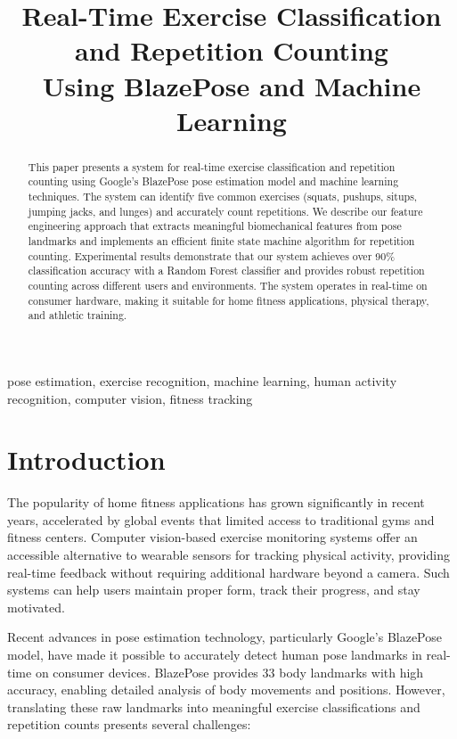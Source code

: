 \documentclass[conference]{IEEEtran}
\title{Real-Time Exercise Classification and Repetition Counting \\Using BlazePose and Machine Learning}
\author{\IEEEauthorblockN{Atharv Khisti}
\IEEEauthorblockA{Department of Computer Science\\
University Name\\
City, Country\\
email@example.com}}
\begin{document}
\maketitle

\begin{abstract}
This paper presents a system for real-time exercise classification and repetition counting using Google's BlazePose pose estimation model and machine learning techniques. The system can identify five common exercises (squats, pushups, situps, jumping jacks, and lunges) and accurately count repetitions. We describe our feature engineering approach that extracts meaningful biomechanical features from pose landmarks and implements an efficient finite state machine algorithm for repetition counting. Experimental results demonstrate that our system achieves over 90\% classification accuracy with a Random Forest classifier and provides robust repetition counting across different users and environments. The system operates in real-time on consumer hardware, making it suitable for home fitness applications, physical therapy, and athletic training.
\end{abstract}

\begin{IEEEkeywords}
pose estimation, exercise recognition, machine learning, human activity recognition, computer vision, fitness tracking
\end{IEEEkeywords}

\section{Introduction}
The popularity of home fitness applications has grown significantly in recent years, accelerated by global events that limited access to traditional gyms and fitness centers. Computer vision-based exercise monitoring systems offer an accessible alternative to wearable sensors for tracking physical activity, providing real-time feedback without requiring additional hardware beyond a camera. Such systems can help users maintain proper form, track their progress, and stay motivated.

Recent advances in pose estimation technology, particularly Google's BlazePose \cite{bazarevsky2020blazepose} model, have made it possible to accurately detect human pose landmarks in real-time on consumer devices. BlazePose provides 33 body landmarks with high accuracy, enabling detailed analysis of body movements and positions. However, translating these raw landmarks into meaningful exercise classifications and repetition counts presents several challenges:
\end{document}
